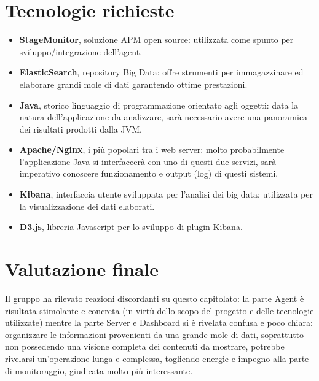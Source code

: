 \documentclass[StudioDiFattibilità.tex]{subfiles}
\begin{document}
\section{Tecnologie richieste}
\begin{itemize}
	\item \textbf{StageMonitor}, soluzione APM open source: utilizzata come spunto per sviluppo/integrazione dell'agent.
	\item \textbf{ElasticSearch}, repository Big Data: offre strumenti per immagazzinare ed elaborare grandi mole di dati garantendo ottime prestazioni.
	\item \textbf{Java}, storico linguaggio di programmazione orientato agli oggetti: data la natura dell'applicazione da analizzare, sarà necessario avere una panoramica dei risultati prodotti dalla JVM.
	\item \textbf{Apache/Nginx}, i più popolari tra i web server: molto probabilmente l'applicazione Java si interfaccerà con uno di questi due servizi, sarà imperativo conoscere funzionamento e output (log) di questi sistemi. 
	\item \textbf{Kibana}, interfaccia utente sviluppata per l'analisi dei big data: utilizzata per la visualizzazione dei dati elaborati.
	\item \textbf{D3.js}, libreria Javascript per lo sviluppo di plugin Kibana.
\end{itemize}
\section{Valutazione finale}
Il gruppo ha rilevato reazioni discordanti su questo capitolato: la parte Agent è risultata stimolante e concreta (in virtù dello scopo del progetto e delle tecnologie utilizzate) mentre la parte Server e Dashboard si è rivelata confusa e poco chiara: organizzare le informazioni provenienti da una grande mole di dati, soprattutto non possedendo una visione completa dei contenuti da mostrare, potrebbe rivelarsi un'operazione lunga e complessa, togliendo energie e impegno alla parte di monitoraggio, giudicata molto più interessante.  
\end{document}
